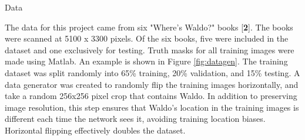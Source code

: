 \documentclass[final]{beamer}
\newlength{\onecolwid}
\begin{document}
\begin{frame}[t]
\begin{columns}[t]
\begin{column}{\onecolwid}




\begin{block}{Data}



The data for this project came from six "Where's Waldo?" books [\textbf{2}]. The books were scanned at 5100 x 3300 pixels. Of the six books, five were included in the dataset and one exclusively for testing. Truth masks for all training images were made using Matlab. An example is shown in Figure \ref{fig:datagen}. The training dataset was split randomly into 65\%  training, 20\% validation, and 15\% testing. A data generator was created to randomly flip the training images horizontally, and take a random 256x256 pixel crop that contains Waldo. In addition to preserving image resolution, this step ensures that Waldo's location in the training images is different each time the network sees it, avoiding training location biases. Horizontal flipping effectively doubles the dataset. 

\vspace{0.6in}


\end{block}
\end{column}
\end{columns}
\end{frame}
\end{document}
